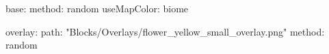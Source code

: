 base:
  method: random
  useMapColor: biome
  
overlay:
  path: "Blocks/Overlays/flower_yellow_small_overlay.png"
  method: random